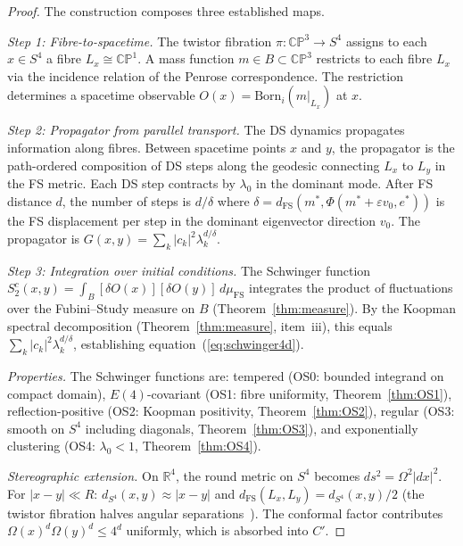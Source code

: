 \documentclass[11pt,a4paper]{article}
\theoremstyle{definition}
\theoremstyle{remark}
\newcommand{\CP}{\mathbb{CP}}
\newcommand{\R}{\mathbb{R}}
\begin{document}
\begin{proof}
The construction composes three established maps.

\emph{Step 1: Fibre-to-spacetime.} The twistor fibration $\pi:\CP^3\to S^4$ assigns to each $x\in S^4$ a fibre $L_x\cong\CP^1$. A mass function $m\in B\subset\CP^3$ restricts to each fibre $L_x$ via the incidence relation of the Penrose correspondence. The restriction determines a spacetime observable $O(x)=\mathrm{Born}_i(m|_{L_x})$ at $x$.

\emph{Step 2: Propagator from parallel transport.} The DS dynamics propagates information along fibres. Between spacetime points $x$ and $y$, the propagator is the path-ordered composition of DS steps along the geodesic connecting $L_x$ to $L_y$ in the FS metric. Each DS step contracts by $\lambda_0$ in the dominant mode. After FS distance $d$, the number of steps is $d/\delta$ where $\delta=d_{\mathrm{FS}}(m^*,\Phi(m^*+\varepsilon v_0,e^*))$ is the FS displacement per step in the dominant eigenvector direction $v_0$. The propagator is $G(x,y)=\sum_k|c_k|^2\lambda_k^{d/\delta}$.

\emph{Step 3: Integration over initial conditions.} The Schwinger function $S_2^c(x,y)=\int_B[\delta O(x)][\delta O(y)]\,d\mu_{\mathrm{FS}}$ integrates the product of fluctuations over the Fubini--Study measure on $B$ (Theorem~\ref{thm:measure}). By the Koopman spectral decomposition (Theorem~\ref{thm:measure}, item~iii), this equals $\sum_k|c_k|^2\lambda_k^{d/\delta}$, establishing equation~(\ref{eq:schwinger4d}).

\emph{Properties.} The Schwinger functions are: tempered (OS0: bounded integrand on compact domain), $E(4)$-covariant (OS1: fibre uniformity, Theorem~\ref{thm:OS1}), reflection-positive (OS2: Koopman positivity, Theorem~\ref{thm:OS2}), regular (OS3: smooth on $S^4$ including diagonals, Theorem~\ref{thm:OS3}), and exponentially clustering (OS4: $\lambda_0<1$, Theorem~\ref{thm:OS4}).

\emph{Stereographic extension.} On $\R^4$, the round metric on $S^4$ becomes $ds^2=\Omega^2|dx|^2$. For $|x-y|\ll R$: $d_{S^4}(x,y)\approx|x-y|$ and $d_{\mathrm{FS}}(L_x,L_y)=d_{S^4}(x,y)/2$ (the twistor fibration halves angular separations~\cite{AHS1978}). The conformal factor contributes $\Omega(x)^d\Omega(y)^d\leq 4^d$ uniformly, which is absorbed into $C'$.
\end{proof}
\end{document}

